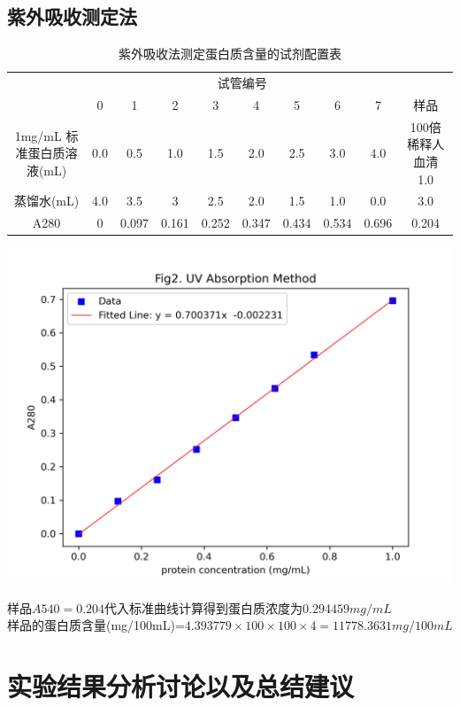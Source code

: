 \documentclass[UTF8]{ctexart}
\begin{document}
\subsection{紫外吸收测定法}
\begin{table}[H]
        \centering
        \caption{紫外吸收法测定蛋白质含量的试剂配置表}
        \begin{tabular}{cccccccccc}
        \toprule
        & \multicolumn{8}{c}{试管编号} \\
        \cmidrule{2-9} 
        & 0 & 1 & 2 & 3 & 4 & 5 & 6 & 7 & 样品 \\
        \midrule
        1mg/mL 标准蛋白质溶液(mL) & 0.0 & 0.5 & 1.0 & 1.5 & 2.0 & 2.5 & 3.0 & 4.0 & 100倍稀释人血清 1.0 \\
        蒸馏水(mL) & 4.0 & 3.5 & 3 & 2.5 & 2.0 & 1.5 & 1.0 & 0.0 & 3.0 \\
		A280 & 0 & 0.097 & 0.161 & 0.252 & 0.347 & 0.434 & 0.534 & 0.696 & 0.204\\
        \bottomrule
        \end{tabular}
\end{table}

\includegraphics{A280.png}

样品$A540=0.204$代入标准曲线计算得到蛋白质浓度为$0.294459mg/mL$\\
样品的蛋白质含量(mg/100mL)=$4.393779\times 100 \times 100 \times 4 =11778.3631mg/100mL$
\vfill
\section{实验结果分析讨论以及总结建议}
\end{document}
